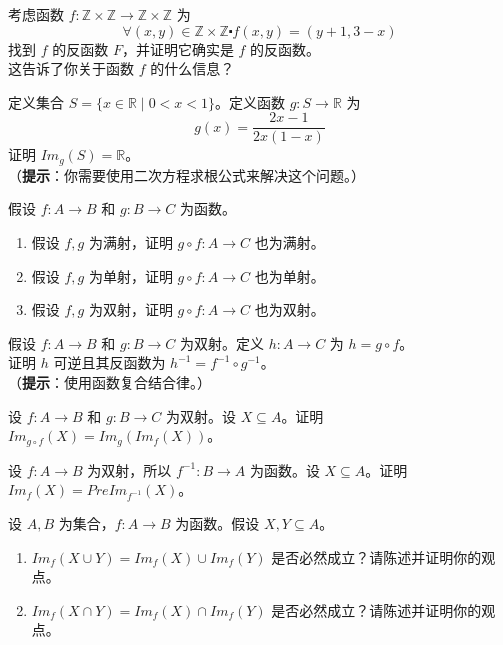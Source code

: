 \begin{exercise}
    考虑函数 $f : \mathbb{Z} \times \mathbb{Z} \to \mathbb{Z} \times \mathbb{Z}$ 为
    \[\forall (x, y) \in \mathbb{Z} \times \mathbb{Z} \centerdot f(x, y) = (y + 1, 3 - x)\]
    找到 $f$ 的反函数 $F$，并证明它确实是 $f$ 的反函数。\\
    这告诉了你关于函数 $f$ 的什么信息？
\end{exercise}

\begin{exercise}
    定义集合 $S = \{x \in \mathbb{R} \mid 0 < x < 1\}$。定义函数 $g:S \to \mathbb{R}$ 为
    \[g(x) = \frac{2x-1}{2x(1-x)}\]
    证明 $Im_g(S) = \mathbb{R}$。\\
    （\textbf{提示}：你需要使用二次方程求根公式来解决这个问题。）
\end{exercise}

\begin{exercise}
    假设 $f : A \to B$ 和 $g : B \to C$ 为函数。
    \begin{enumerate}[label=(\alph*)]
        \item 假设 $f, g$ 为满射，证明 $g \circ f : A \to C$ 也为满射。
        \item 假设 $f, g$ 为单射，证明 $g \circ f : A \to C$ 也为单射。
        \item 假设 $f, g$ 为双射，证明 $g \circ f : A \to C$ 也为双射。
    \end{enumerate} \label{exc:exercises7.8.9}
\end{exercise}

\begin{exercise}
    假设 $f : A \to B$ 和 $g : B \to C$ 为双射。定义 $h : A \to C$ 为 $h = g \circ f$。\\
    证明 $h$ 可逆且其反函数为 $h^{-1} = f^{-1} \circ g^{-1}$。\\
    （\textbf{提示}：使用函数复合结合律。）\label{exc:exercises7.8.10}
\end{exercise} 

\begin{exercise}
    设 $f : A \to B$ 和 $g : B \to C$ 为双射。设 $X \subseteq A$。证明 $Im_{g \circ f} (X) = Im_g(Im_f (X))$。
\end{exercise}

\begin{exercise}
    设 $f : A \to B$ 为双射，所以 $f^{-1} : B \to A$ 为函数。设 $X \subseteq A$。证明 $Im_f (X) = PreIm_{f^{-1}} (X)$。
\end{exercise}

\begin{exercise}
    设 $A, B$ 为集合，$f : A \to B$ 为函数。假设 $X,Y \subseteq A$。
    \begin{enumerate}[label=(\alph*)]
        \item $Im_f (X \cup Y) = Im_f (X) \cup Im_f (Y)$ 是否必然成立？请陈述并证明你的观点。
        \item $Im_f (X \cap Y) = Im_f (X) \cap Im_f (Y)$ 是否必然成立？请陈述并证明你的观点。
    \end{enumerate}
\end{exercise}

